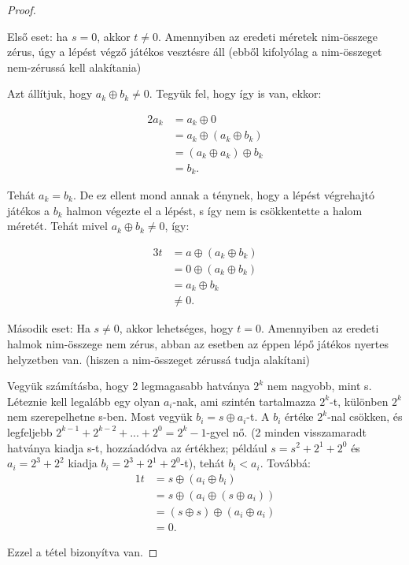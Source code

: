 \begin{proof}
\begin{lemma}
Első eset: ha $s = 0$, akkor $t \neq 0$. Amennyiben az eredeti méretek nim-összege zérus, úgy a lépést végző játékos vesztésre áll (ebből kifolyólag a nim-összeget nem-zérussá kell alakítania)\ujsor

Azt állítjuk, hogy $a_k \oplus b_k \neq 0$. Tegyük fel, hogy így is van, ekkor:

\begin{alignat*}{2}
	a_k &= a_k \oplus 0 \\
	&= a_k \oplus (a_k \oplus b_k) \\
	&= (a_k \oplus a_k) \oplus b_k \\
	&= b_k.
\end{alignat*}

Tehát $a_k = b_k$. De ez ellent mond annak a ténynek, hogy a lépést végrehajtó játékos a $b_k$ halmon végezte el a lépést, s így nem is csökkentette a halom méretét. \ujsor
Tehát mivel $a_k \oplus b_k \neq 0$, így:

\begin{alignat*}{3}
	t &= a \oplus (a_k \oplus b_k) \\
	&= 0 \oplus (a_k \oplus b_k) \\
	&= a_k \oplus b_k \\
	&\neq 0.
\end{alignat*}

\end{lemma}

\begin{lemma}
Második eset: Ha $s \neq 0$, akkor lehetséges, hogy $t = 0$. Amennyiben  az eredeti halmok nim-összege nem zérus, abban az esetben az éppen lépő játékos nyertes helyzetben van. (hiszen a nim-összeget zérussá tudja alakítani) \ujsor

Vegyük számításba, hogy 2 legmagasabb hatványa $2^k$ nem nagyobb, mint s. Léteznie kell legalább egy olyan $a_i$-nak, ami szintén tartalmazza $2^k$-t, különben $2^k$ nem szerepelhetne s-ben. Most vegyük $b_i = s \oplus a_i$-t. A $b_i$ értéke $2^k$-nal csökken, és legfeljebb $2^{k-1} + 2^{k-2} + ... + 2^0 = 2^k -1 $-gyel nő. (2 minden visszamaradt hatványa kiadja s-t, hozzáadódva az értékhez; például $s = s^2 + 2^1 + 2^0$ és $a_i = 2^3 + 2^2$ kiadja $b_i = 2^3 + 2^1 + 2^0$-t), tehát $b_i < a_i$. Továbbá:
\begin{alignat*}{1}
	t &= s \oplus (a_i \oplus b_i) \\
	&= s \oplus (a_i \oplus (s \oplus a_i)) \\
	&= (s \oplus s) \oplus (a_i \oplus a_i) \\
	&= 0.
\end{alignat*}
\end{lemma}

Ezzel a tétel bizonyítva van.
\end{proof}

